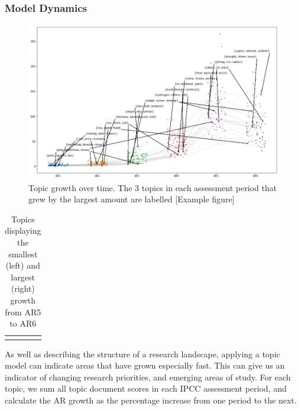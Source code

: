 \documentclass{article}
\begin{document}
\subsubsection*{Model Dynamics}

\begin{figure}
	\includegraphics[width=\linewidth]{plots/hot_topics_65}
	\caption{Topic growth over time. The 3 topics in each assessment period that grew by the largest amount are labelled [Example figure]}
	\label{topic_growth}
\end{figure}

\begin{table}
	\begin{center}
	\begin{tabular}{cc}
	 & 
	\end{tabular}
	\caption{Topics displaying the smallest (left) and largest (right) growth from AR5 to AR6}
    \label{AR6}
	\end{center}
	
\end{table}

As well as describing the structure of a research landscape, applying a topic model can indicate areas that have grown especially fast. This can give us an indicator of changing research priorities, and emerging areas of study. For each topic, we sum all topic document scores in each IPCC assessment period, and calculate the AR growth as the percentage increase from one period to the next.
\end{document}
